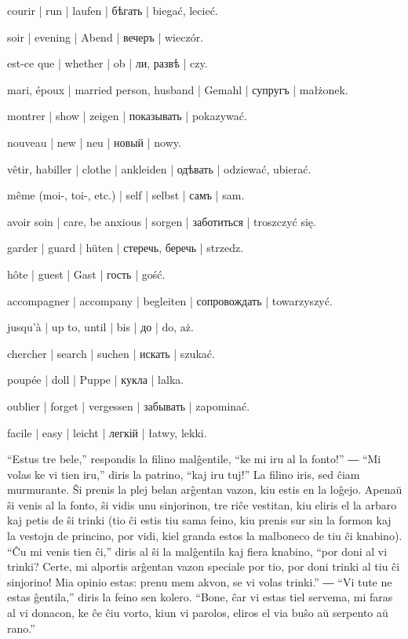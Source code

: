 \begin{ekzvocab}{1em}
 courir | run | laufen | бѣгать | biegać, lecieć.

 soir | evening | Abend | вечеръ | wieczór.

 est-ce que | whether | ob | ли, развѣ | czy.

 mari, époux | married person, husband | Gemahl | супругъ | małżonek.

 montrer | show | zeigen | показывать | pokazywać.

 nouveau | new | neu | новый | nowy.

 vêtir, habiller | clothe | ankleiden | одѣвать | odziewać, ubierać.

 même (moi-, toi-, etc.) | self | selbst | самъ | sam.

 avoir soin | care, be anxious | sorgen | заботиться | troszczyć się.

 garder | guard | hüten | стеречь, беречь | strzedz.

 hôte | guest | Gast | гость | gość.

 accompagner | accompany | begleiten | сопровождать | towarzyszyć.

 jusqu’à | up to, until | bis | до | do, aż.

 chercher | search | suchen | искать | szukać.

 poupée | doll | Puppe | кукла | lalka.

 oublier | forget | vergessen | забывать | zapominać.

 facile | easy | leicht | легкій | łatwy, lekki.

\end{ekzvocab}


“Estus tre bele,” respondis la filino malĝentile, “ke mi iru al la fonto!” ― “Mi volas\unuakomon{} ke vi tien iru,” diris la patrino, “kaj iru tuj!” La filino iris, sed ĉiam murmurante. Ŝi prenis la plej belan arĝentan vazon, kiu estis en la loĝejo. Apenaŭ ŝi venis al la fonto, ŝi vidis unu sinjorinon, tre riĉe vestitan, kiu eliris el la arbaro kaj petis de ŝi trinki (tio ĉi estis tiu sama feino, kiu prenis sur sin la formon kaj la vestojn de princino, por vidi, kiel granda estos la malboneco de tiu ĉi knabino). “Ĉu mi venis tien ĉi,” diris al ŝi la malĝentila kaj fiera knabino, “por doni al vi trinki? Certe, mi alportis arĝentan vazon speciale por tio, por doni trinki al tiu ĉi sinjorino! Mia opinio estas: prenu mem akvon, se vi volas trinki.” ― “Vi tute ne estas ĝentila,” diris la feino sen kolero. “Bone, ĉar vi estas tiel servema, mi faras al vi donacon, ke ĉe ĉiu vorto, kiun vi parolos, eliros el via buŝo aŭ serpento aŭ rano.”

